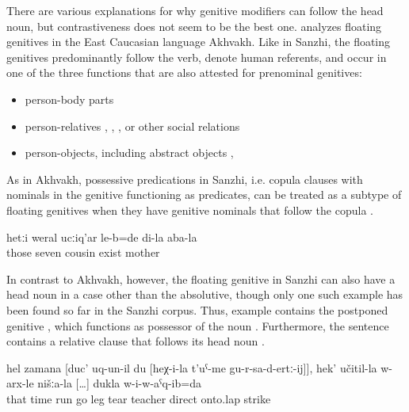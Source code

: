 There are various explanations for why genitive modifiers can follow the head noun, but contrastiveness does not seem to be the best one. \citet{Creissels2013} analyzes floating genitives in the East Caucasian language Akhvakh. Like in Sanzhi, the floating genitives predominantly follow the verb, denote human referents, and occur in one of the three functions that are also attested for prenominal genitives:
%
\begin{itemize}
	\item	person-body parts
	\item	person-relatives , , , or other social relations 
	\item	person-objects, including abstract objects , 
\end{itemize}

As in Akhvakh, possessive predications in Sanzhi, i.e. copula clauses with nominals in the genitive functioning as predicates, can be treated as a subtype of floating genitives when they have genitive nominals that follow the copula .
%
\begin{exe}
	\ex	\label{ex:‎My mother had seven cousins}
	\gll	hetːi	weral	ucːiq'ar	le-b=de	di-la	aba-la\\
		those	seven	cousin	exist		mother\\
	\glt	{}
\end{exe}

In contrast to Akhvakh, however, the floating genitive in Sanzhi can also have a head noun in a case other than the absolutive, though only one such example has been found so far in the Sanzhi corpus. Thus, example  contains the postponed genitive  , which functions as possessor of the noun  . Furthermore, the sentence contains a relative clause that follows its head noun  .
%
\begin{exe}
	\ex	\label{ex:‎At the time when I run to pull his legs, I fell (lit. hit) directly on the lap of our teacher}
	\gll	hel	zamana	[duc'	uq-un-il	du	[heχ-i-la	t'uˁ-me	gu-r-sa-d-ertː-ij]],	hek'	učitil-la	w-arx-le	nišːa-la	[\ldots]	dukla	w-i-w-aˁq-ib=da\\
		that	time	run	go			leg	tear		teacher	direct	 {}	onto.lap	strike\\
	\glt	{}
\end{exe}

